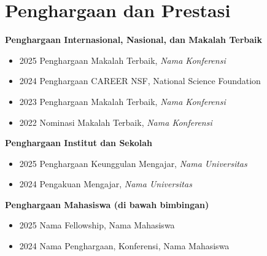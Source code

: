 \section{Penghargaan dan Prestasi}

\noindent\textbf{Penghargaan Internasional, Nasional, dan Makalah Terbaik}
\begin{itemize}
  \item 2025 \quad Penghargaan Makalah Terbaik, \textit{Nama Konferensi}
  \item 2024 \quad Penghargaan CAREER NSF, National Science Foundation
  \item 2023 \quad Penghargaan Makalah Terbaik, \textit{Nama Konferensi}
  \item 2022 \quad Nominasi Makalah Terbaik, \textit{Nama Konferensi}
\end{itemize}

\noindent\textbf{Penghargaan Institut dan Sekolah}
\begin{itemize}
  \item 2025 \quad Penghargaan Keunggulan Mengajar, \textit{Nama Universitas}
  \item 2024 \quad Pengakuan Mengajar, \textit{Nama Universitas}
\end{itemize}

\noindent\textbf{Penghargaan Mahasiswa (di bawah bimbingan)}
\begin{itemize}
  \item 2025 \quad Nama Fellowship, Nama Mahasiswa
  \item 2024 \quad Nama Penghargaan, Konferensi, Nama Mahasiswa
\end{itemize}
